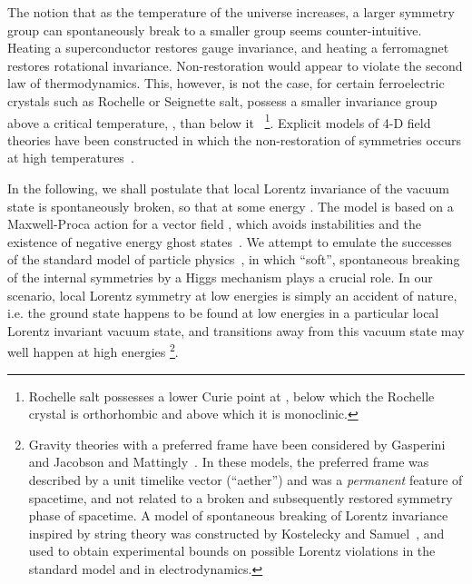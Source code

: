 \documentclass[a4paper,12pt]{article}
\begin{document}
The notion that as the temperature of the universe increases, a larger
symmetry group \coordHE{} can spontaneously break to a smaller group \coordHE{}
seems counter-intuitive. Heating a superconductor restores gauge
invariance, and heating a ferromagnet restores rotational invariance.
Non-restoration would appear to violate the second law of
thermodynamics. This, however, is not the case, for certain
ferroelectric crystals such as Rochelle or Seignette salt,
possess a smaller invariance group above a critical temperature,
\coordHE{}, than below it~\cite{Jona} \footnote{Rochelle salt
possesses a lower Curie point at \coordHE{}, below which the
Rochelle crystal is orthorhombic and above which it is
monoclinic.}. Explicit models of 4-D field theories have been
constructed in which the non-restoration of symmetries
occurs at high temperatures~\cite{Weinberg}.

In the following, we shall postulate that local Lorentz invariance of the vacuum
state is spontaneously broken, so that \coordHE{} at some energy
\coordHE{}. The model is based on a Maxwell-Proca action for a vector field \myHighlight{$\phi^\mu$}\coordHE{},
which avoids instabilities and the existence of negative energy ghost
states~\cite{Isenberg,Clayton}. We attempt to emulate the successes of the standard
model of particle physics~\cite{Cheng}, in which ``soft'', spontaneous breaking of
the internal symmetries by a Higgs mechanism plays a crucial role. In our scenario,
local Lorentz symmetry at low energies is simply an accident of nature, i.e. the
ground state happens to be found at low energies in a particular local Lorentz
invariant vacuum state, and transitions away from this vacuum state may well happen
at high energies \footnote{Gravity theories with a preferred frame have been
considered by Gasperini~\cite{Gasperini} and Jacobson and Mattingly~\cite{Jacobson}.
In these models, the preferred frame was described by a unit timelike vector
(``aether'') and was a {\it permanent} feature of spacetime, and not related to a
broken and subsequently restored symmetry phase of spacetime. A model of spontaneous
breaking of Lorentz invariance inspired by string theory was constructed by
Kostelecky and Samuel~\cite{Samuel,Kostelecky,Lehnert}, and used to obtain
experimental bounds on possible Lorentz violations in the standard model and in
electrodynamics.}.
\end{document}
